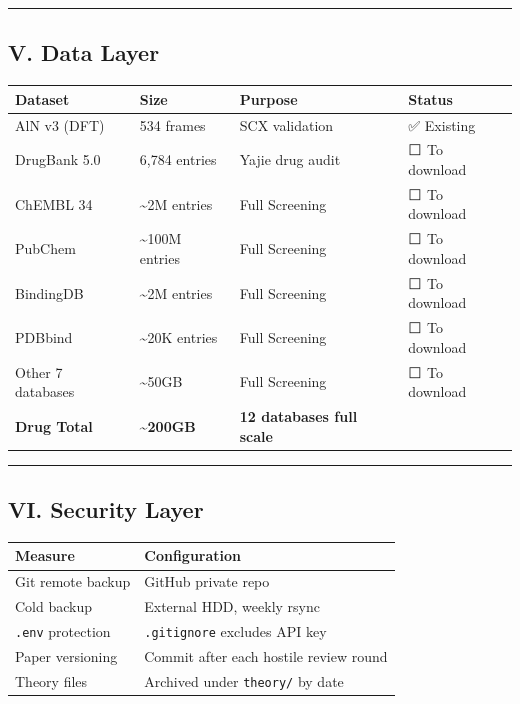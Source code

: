 \documentclass[
  12pt,
]{article}
\begin{document}
\begin{center}\rule{0.5\linewidth}{0.5pt}\end{center}

\subsection{V. Data Layer}\label{v-data-layer}

\begin{longtable}[]{@{}llll@{}}
\toprule\noalign{}
Dataset & Size & Purpose & Status \\
\midrule\noalign{}
\endhead
\bottomrule\noalign{}
\endlastfoot
AlN v3 (DFT) & 534 frames & SCX validation & ✅ Existing \\
DrugBank 5.0 & 6,784 entries & Yajie drug audit & ⬜ To download \\
ChEMBL 34 & \textasciitilde2M entries & Full Screening & ⬜ To download \\
PubChem & \textasciitilde100M entries & Full Screening & ⬜ To download \\
BindingDB & \textasciitilde2M entries & Full Screening & ⬜ To download \\
PDBbind & \textasciitilde20K entries & Full Screening & ⬜ To download \\
Other 7 databases & \textasciitilde50GB & Full Screening & ⬜ To download \\
\textbf{Drug Total} & \textbf{\textasciitilde200GB} & \textbf{12 databases full scale} & \\
\end{longtable}

\begin{center}\rule{0.5\linewidth}{0.5pt}\end{center}

\subsection{VI. Security Layer}\label{vi-security-layer}

\begin{longtable}[]{@{}ll@{}}
\toprule\noalign{}
Measure & Configuration \\
\midrule\noalign{}
\endhead
\bottomrule\noalign{}
\endlastfoot
Git remote backup & GitHub private repo \\
Cold backup & External HDD, weekly rsync \\
\texttt{.env} protection & \texttt{.gitignore} excludes API key \\
Paper versioning & Commit after each hostile review round \\
Theory files & Archived under \texttt{theory/} by date \\
\end{longtable}
\end{document}
